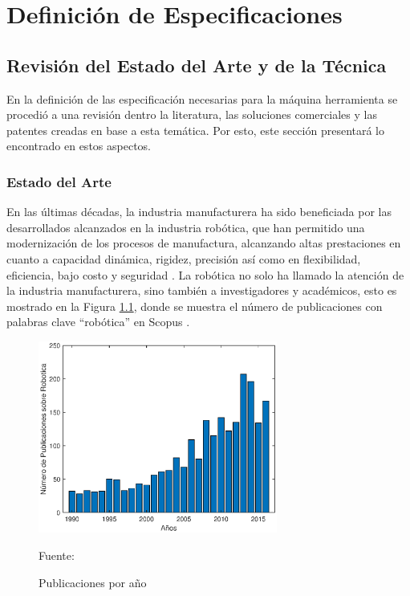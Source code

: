 \chapter{Definición de Especificaciones}
\label{section:DefiniciondeEspeficaciones}

\section{Revisión del Estado del Arte y de la Técnica}
En la definición de las especificación necesarias para la máquina herramienta se procedió a una revisión dentro la literatura, las soluciones comerciales y las patentes creadas en base a esta temática. Por esto, este sección presentará lo encontrado en estos aspectos.

\subsection{Estado del Arte}
En las últimas décadas, la industria manufacturera ha sido beneficiada por las desarrollados alcanzados en la industria robótica, que han permitido una modernización de los procesos de manufactura, alcanzando altas prestaciones en cuanto a capacidad dinámica, rigidez, precisión \citep{serje2017parallel} así como en flexibilidad, eficiencia, bajo costo y seguridad \citep{yuan2018review,stipanvcic2012programming,vsvaco2014calibration}. La robótica no solo ha llamado la atención de la industria manufacturera, sino también a investigadores y académicos, esto es mostrado en la Figura \ref{fig:PublicacionesPorAnio}, donde se muestra el número de publicaciones con palabras clave “robótica” en Scopus \citep{yuan2018review}.

\begin{figure}[ht!]
    \centering
    \includegraphics[width=0.7\textwidth]{Cap2_DisenoEspecificaciones/Figura/PublicacionesPorAnio.eps}
    \caption{Publicaciones por año}{Fuente:\citep{yuan2018review}}
    \label{fig:PublicacionesPorAnio}
\end{figure}

